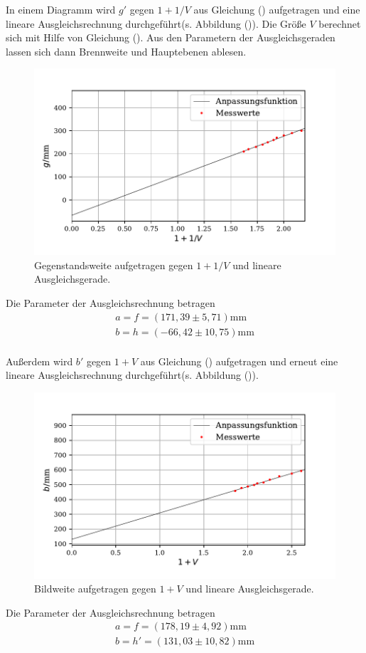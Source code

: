 In einem Diagramm wird $g'$ gegen $1+1/V$ aus Gleichung () aufgetragen und eine lineare Ausgleichsrechnung durchgeführt(s. Abbildung ()). Die Größe $V$ berechnet sich mit Hilfe von Gleichung ().
Aus den Parametern der Ausgleichsgeraden lassen sich dann Brennweite und Hauptebenen ablesen.
\begin{figure}[H]
  \centering
  \includegraphics{plot2.pdf}
  \caption{Gegenstandsweite aufgetragen gegen $1+1/V$ und lineare Ausgleichsgerade.}
  \label{fig:plot}
\end{figure}
Die Parameter der Ausgleichsrechnung betragen
\begin{align*}
a = f = (171,39 \pm 5,71)\si{\milli\meter}\\
b = h = (-66,42\pm 10,75)\si{\milli\meter}\\
\end{align*}


\noindent Außerdem wird $b'$ gegen $1+V$ aus Gleichung () aufgetragen und erneut eine lineare Ausgleichsrechnung durchgeführt(s. Abbildung ()).
\begin{figure}[H]
  \centering
  \includegraphics{plot3.pdf}
  \caption{Bildweite aufgetragen gegen $1+V$ und lineare Ausgleichsgerade.}
  \label{fig:plot}
\end{figure}
Die Parameter der Ausgleichsrechnung betragen
\begin{align*}
a = f = (178,19 \pm 4,92)\si{\milli\meter}\\
b = h' = (131,03\pm 10,82)\si{\milli\meter}\\
\end{align*}

